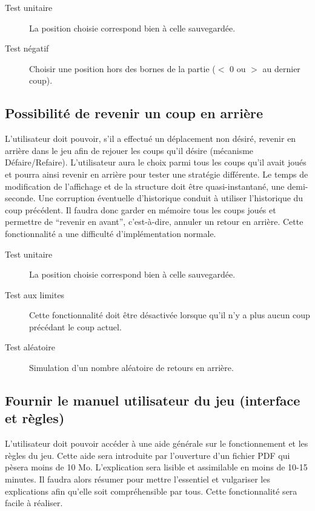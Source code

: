 \documentclass[a4paper,12pt]{article}
\begin{document}
\begin{description}
\item[Test unitaire] La position choisie correspond bien à celle sauvegardée.
\item[Test négatif] Choisir une position hors des bornes de la partie ($<$ 0 ou $>$ au dernier coup).
\end{description}

\subsection{Possibilité de revenir un coup en arrière}

L’utilisateur doit pouvoir, s’il a effectué un déplacement non désiré, revenir en arrière dans le jeu afin de rejouer les coups qu’il désire (mécanisme Défaire/Refaire). L'utilisateur aura le choix parmi tous les coups qu'il avait joués et pourra ainsi revenir en arrière pour tester une stratégie différente. Le temps de modification de l'affichage et de la structure doit être quasi-instantané, une demi-seconde. Une corruption éventuelle d'historique conduit à utiliser l'historique du coup précédent. Il faudra donc garder en mémoire tous les coups joués et permettre de ``revenir en avant'', c'est-à-dire, annuler un retour en arrière. Cette fonctionnalité a une difficulté d'implémentation normale.

\begin{description}
\item[Test unitaire] La position choisie correspond bien à celle sauvegardée.
\item[Test aux limites] Cette fonctionnalité doit être désactivée lorsque qu’il n’y a plus aucun coup précédant le coup actuel.
\item[Test aléatoire] Simulation d'un nombre aléatoire de retours en arrière.
\end{description}

\subsection{Fournir le manuel utilisateur du jeu (interface et règles)}

L'utilisateur doit pouvoir accéder à une aide générale sur le fonctionnement et les règles du jeu. Cette aide sera introduite par l’ouverture d’un fichier PDF qui pèsera moins de 10 Mo. L'explication sera lisible et assimilable en moins de 10-15 minutes. Il faudra alors résumer pour mettre l'essentiel et vulgariser les explications afin qu'elle soit compréhensible par tous. Cette fonctionnalité sera facile à réaliser.
\end{document}
